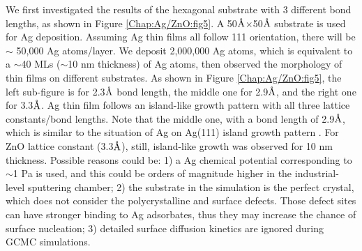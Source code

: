 We first investigated the results of the hexagonal substrate with 3 different bond lengths, as shown in Figure \ref{Chap:Ag/ZnO:fig5}. A 50$\mbox{\normalfont\AA}$$\times$50$\mbox{\normalfont\AA}$ substrate is used for Ag deposition. Assuming Ag thin films all follow {111} orientation, there will be $\sim$ 50,000 Ag atoms/layer. We deposit 2,000,000 Ag atoms, which is equivalent to a $\sim$40 \ac{ML}s ($\sim$10 nm thickness) of Ag atoms, then observed the morphology of thin films on different substrates. As shown in Figure \ref{Chap:Ag/ZnO:fig5}, the left sub-figure is for 2.3$\mbox{\normalfont\AA}$ bond length, the middle one for 2.9$\mbox{\normalfont\AA}$, and the right one for 3.3$\mbox{\normalfont\AA}$. Ag thin film follows an island-like growth pattern with all three lattice constants/bond lengths. Note that the middle one, with a bond length of 2.9$\mbox{\normalfont\AA}$, which is similar to the situation of Ag on Ag(111) island growth pattern \cite{li2008exploration}. For ZnO lattice constant (3.3$\mbox{\normalfont\AA}$), still, island-like growth was observed for 10 nm thickness. Possible reasons could be: 1) a Ag chemical potential corresponding to $\sim$1 Pa is used, and this could be orders of magnitude higher in the industrial-level sputtering chamber; 2) the substrate in the simulation is the perfect crystal, which does not consider the polycrystalline and surface defects. Those defect sites can have stronger binding to Ag adsorbates, thus they may increase the chance of surface nucleation; 3) detailed surface diffusion kinetics are ignored during \ac{GCMC} simulations.

